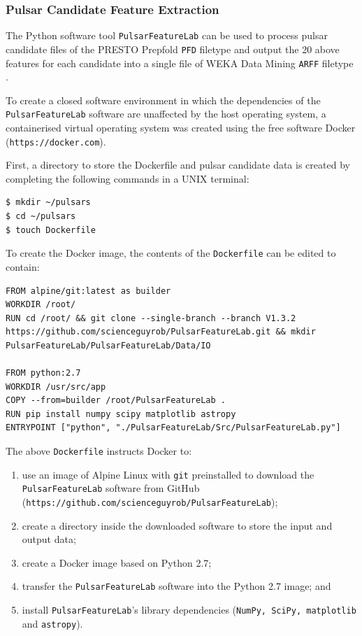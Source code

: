 \documentclass{article}
\begin{document}
\subsubsection{Pulsar Candidate Feature Extraction}

The Python software tool \verb|PulsarFeatureLab| can be used to process pulsar candidate files of the PRESTO Prepfold \verb|PFD| filetype and output the 20 above features for each candidate into a single file of WEKA Data Mining \verb|ARFF| filetype \autocite{lyon}.

To create a closed software environment in which the dependencies of the \verb|PulsarFeatureLab| software are unaffected by the host operating system, a containerised virtual operating system was created using the free software Docker (\verb|https://docker.com|).

First, a directory to store the Dockerfile and pulsar candidate data is created by completing the following commands in a UNIX terminal:

\begin{lstlisting}[numbers=none]
$ mkdir ~/pulsars
$ cd ~/pulsars
$ touch Dockerfile
\end{lstlisting}

To create the Docker image, the contents of the \verb|Dockerfile| can be edited to contain:

\begin{lstlisting}[title=Dockerfile]
FROM alpine/git:latest as builder
WORKDIR /root/
RUN cd /root/ && git clone --single-branch --branch V1.3.2 https://github.com/scienceguyrob/PulsarFeatureLab.git && mkdir PulsarFeatureLab/PulsarFeatureLab/Data/IO

FROM python:2.7
WORKDIR /usr/src/app
COPY --from=builder /root/PulsarFeatureLab .
RUN pip install numpy scipy matplotlib astropy
ENTRYPOINT ["python", "./PulsarFeatureLab/Src/PulsarFeatureLab.py"]
\end{lstlisting}

The above \verb|Dockerfile| instructs Docker to:
\begin{enumerate}[label=\roman*.]
    \item use an image of Alpine Linux with \verb|git| preinstalled to download the \verb|PulsarFeatureLab| software from GitHub \\(\verb|https://github.com/scienceguyrob/PulsarFeatureLab|);
    \item create a directory inside the downloaded software to store the input and output data;
    \item create a Docker image based on Python 2.7;
    \item transfer the \verb|PulsarFeatureLab| software into the Python 2.7 image; and
    \item install \verb|PulsarFeatureLab|'s library dependencies (\verb|NumPy, SciPy, matplotlib| and \verb|astropy|).
\end{enumerate}
\end{document}
